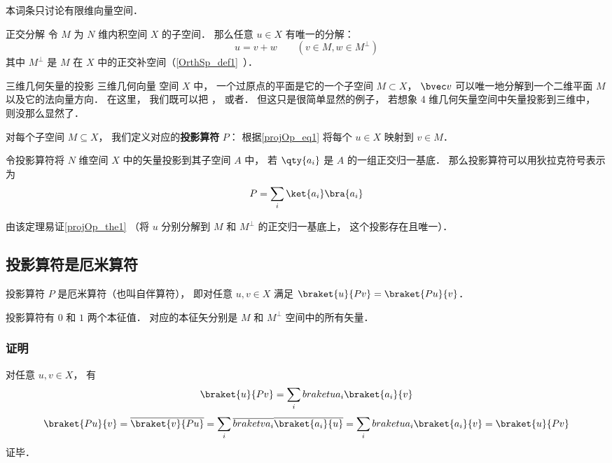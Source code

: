 

本词条只讨论有限维向量空间．

\begin{theorem}{正交分解}\label{projOp_the1}
令 $M$ 为 $N$ 维内积空间 $X$ 的子空间． 那么任意 $u\in X$ 有唯一的分解：
\begin{equation}\label{projOp_eq1}
u = v + w \qquad (v\in M, w\in M^\bot)
\end{equation}
其中 $M^\bot$ 是 $M$ 在 $X$ 中的正交补空间（\autoref{OrthSp_def1}~）．
\end{theorem}

\begin{example}{三维几何矢量的投影}
三维几何向量 空间 $X$ 中， 一个过原点的平面是它的一个子空间 $M \subset X$，  $\bvec v$ 可以唯一地分解到一个二维平面 $M$ 以及它的法向量方向．
在这里， 我们既可以把   ， 或者． 但这只是很简单显然的例子， 若想象 4 维几何矢量空间中矢量投影到三维中， 则没那么显然了．
\end{example}

对每个子空间 $M\subseteq X$， 我们定义对应的\textbf{投影算符} $P$： 根据\autoref{projOp_eq1} 将每个 $u\in X$ 映射到 $v\in M$．

\begin{theorem}{}
令投影算符将 $N$ 维空间 $X$ 中的矢量投影到其子空间 $A$ 中， 若 $\qty{a_i}$ 是 $A$ 的一组正交归一基底． 那么投影算符可以用狄拉克符号表示为
\begin{equation}
P = \sum_i \ket{a_i}\bra{a_i}
\end{equation}
\end{theorem}
由该定理易证\autoref{projOp_the1} （将 $u$ 分别分解到 $M$ 和 $M^\bot$ 的正交归一基底上， 这个投影存在且唯一）．



\subsection{投影算符是厄米算符}
投影算符 $P$ 是厄米算符（也叫自伴算符）， 即对任意 $u, v\in X$ 满足 $\braket{u}{Pv} = \braket{Pu}{v}$．

投影算符有 $0$ 和 $1$ 两个本征值． 对应的本征矢分别是 $M$ 和 $M^\bot$ 空间中的所有矢量．

\subsubsection{证明}
对任意 $u, v\in X$， 有
\begin{equation}
\braket{u}{Pv} = \sum_i \\braket{u}{a_i}\braket{a_i}{v}
\end{equation}
\begin{equation}
\braket{Pu}{v} = \overline {\braket{v}{Pu}} = \sum_i \overline{\\braket{v}{a_i}}\overline{\braket{a_i}{u}} = \sum_i \\braket{u}{a_i}\braket{a_i}{v} = \braket{u}{Pv}
\end{equation}
证毕．
